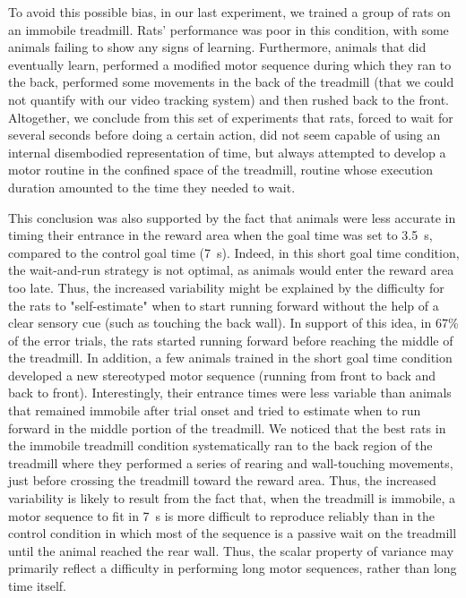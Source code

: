 To avoid this possible bias, in our last experiment, we trained a group of rats on an immobile treadmill.
Rats' performance was poor in this condition, with some animals failing to show any signs of learning.
Furthermore, animals that did eventually learn, performed a modified motor sequence during which they ran to the back, performed some movements in the back of the treadmill (that we could not quantify with our video tracking system) and then rushed back to the front.
Altogether, we conclude from this set of experiments that rats, forced to wait for several seconds before doing a certain action, did not seem capable of using an internal disembodied representation of time, but always attempted to develop a motor routine in the confined space of the treadmill, routine whose execution duration amounted to the time they needed to wait.
\par
This conclusion was also supported by the fact that animals were less accurate in timing their entrance in the reward area when the goal time was set to 3.5~s, compared to the control goal time (7~s).
Indeed, in this short goal time condition, the wait-and-run strategy is not optimal, as animals would enter the reward area too late.
Thus, the increased variability might be explained by the difficulty for the rats to "self-estimate" when to start running forward without the help of a clear sensory cue (such as touching the back wall).
In support of this idea, in 67\% of the error trials, the rats started running forward before reaching the middle of the treadmill.
In addition, a few animals trained in the short goal time condition developed a new stereotyped motor sequence (running from front to back and back to front).
Interestingly, their entrance times were less variable than animals that remained immobile after trial onset and tried to estimate when to run forward in the middle portion of the treadmill.
We noticed that the best rats in the immobile treadmill condition systematically ran to the back region of the treadmill where they performed a series of rearing and wall-touching movements, just before crossing the treadmill toward the reward area.
Thus, the increased variability is likely to result from the fact that, when the treadmill is immobile, a motor sequence to fit in 7~s is more difficult to reproduce reliably than in the control condition in which most of the sequence is a passive wait on the treadmill until the animal reached the rear wall.
Thus, the scalar property of variance may primarily reflect a difficulty in performing long motor sequences, rather than long time itself.
